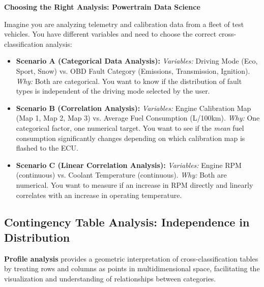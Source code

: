 \vspace{0.3cm}
\begin{example}{\textbf{Choosing the Right Analysis: Powertrain Data Science}}

Imagine you are analyzing telemetry and calibration data from a fleet of test vehicles. You have different variables and need to choose the correct cross-classification analysis:

\begin{itemize}
    \item \textbf{Scenario A (Categorical Data Analysis):} 
    \newline \textit{Variables:} Driving Mode (Eco, Sport, Snow) vs. OBD Fault Category (Emissions, Transmission, Ignition).
    \newline \textit{Why:} Both are categorical. You want to know if the distribution of fault types is independent of the driving mode selected by the user.

    \vs
    \item \textbf{Scenario B (Correlation Analysis):}
    \newline \textit{Variables:} Engine Calibration Map (Map 1, Map 2, Map 3) vs. Average Fuel Consumption (L/100km).
    \newline \textit{Why:} One categorical factor, one numerical target. You want to see if the \textit{mean} fuel consumption significantly changes depending on which calibration map is flashed to the ECU.

    \vs
    \item \textbf{Scenario C (Linear Correlation Analysis):}
    \newline \textit{Variables:} Engine RPM (continuous) vs. Coolant Temperature (continuous).
    \newline \textit{Why:} Both are numerical. You want to measure if an increase in RPM directly and linearly correlates with an increase in operating temperature.
\end{itemize}
\end{example}

\subsection{Contingency Table Analysis: Independence in Distribution}

\textbf{Profile analysis} provides a geometric interpretation of cross-classification tables by treating rows and columns as points in multidimensional space, facilitating the visualization and understanding of relationships between categories.


